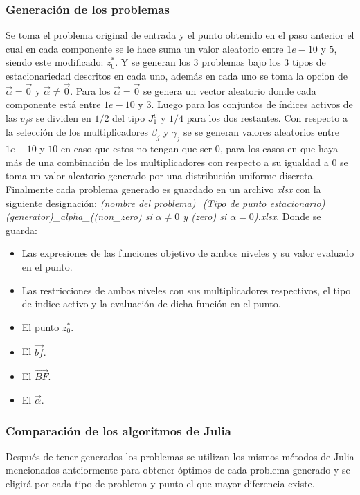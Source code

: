 \subsubsection{Generación de los problemas}
Se toma el problema original de entrada y el punto obtenido en el paso anterior el cual en cada componente se le hace suma un
valor aleatorio entre $1e-10$ y $5$, siendo este modificado: $z^*_0$. 
Y se generan los 3 problemas bajo los 3 tipos de estacionariedad descritos en cada uno, 
además en cada uno se toma la opcion de $\vec{\alpha}=\vec{0}$ y $\vec{\alpha}\ne \vec{0}$.
Para los $\vec{\alpha}=\vec{0}$ se genera un vector aleatorio donde cada componente está entre $1e-10$ y $3$.
Luego para los conjuntos de índices activos de las $v_{j}s$ se dividen en $1/2$ del tipo $J_1^v$  y $1/4$ para los dos restantes.
Con respecto a la selección de los multiplicadores $\beta_j$ y $\gamma_j$ se 
se generan valores aleatorios entre $1e-10$ y $10$ en caso que estos no tengan que ser $0$, 
para los casos en que haya más de una combinación de los multiplicadores con respecto a su igualdad a $0$
se toma un valor aleatorio generado por una distribución uniforme discreta.
Finalmente cada problema generado es guardado en un archivo \textit{xlsx} con la siguiente designación:
\textit{(nombre del problema)\_(Tipo de punto estacionario)(generator)\_alpha\_((non\_zero) si $\alpha \neq 0$ y (zero) si $\alpha = 0$).xlsx}.
Donde se guarda: 
\begin{itemize}
    \item Las expresiones de las funciones objetivo de ambos niveles y su valor evaluado en el punto.
    \item Las restricciones de ambos niveles con sus multiplicadores respectivos, el tipo de indice activo y la evaluación de dicha función en el punto.
    \item El punto $z^*_0$.
    \item El $\vec{bf}.$
    \item El $\vec{BF}$.
    \item El $\vec{\alpha}$.
\end{itemize}

\subsubsection{Comparación de los algoritmos de Julia}
Después de tener generados los problemas se utilizan los mismos métodos de Julia mencionados anteiormente
para obtener óptimos de cada problema generado y se eligirá por cada tipo de problema y punto el que mayor diferencia existe.








